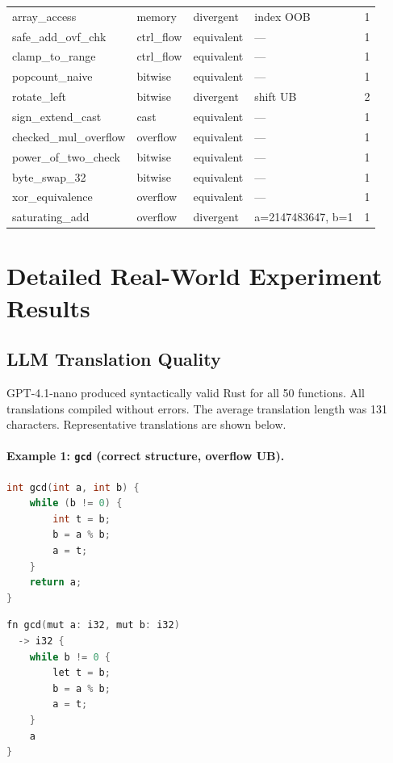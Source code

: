 \documentclass[11pt,a4paper]{article}
\begin{document}
\begin{appendices}
\begin{table}[h]
\begin{tabular}{@{}llllr@{}}
array\_access            & memory     & divergent & index OOB & 1 \\
safe_add_ovf_chk & ctrl\_flow & equivalent & --- & 1 \\
clamp\_to\_range         & ctrl\_flow & equivalent & --- & 1 \\
popcount\_naive          & bitwise    & equivalent & --- & 1 \\
rotate_left& bitwise   & divergent  & shift UB & 2 \\
sign\_extend\_cast       & cast       & equivalent & --- & 1 \\
checked\_mul\_overflow   & overflow   & equivalent & --- & 1 \\
power\_of\_two\_check    & bitwise    & equivalent & --- & 1 \\
byte\_swap\_32           & bitwise    & equivalent & --- & 1 \\
xor\_equivalence         & overflow   & equivalent & --- & 1 \\
saturating\_add          & overflow   & divergent  & a=2147483647, b=1 & 1 \\
\bottomrule
\end{tabular}
\end{table}


\section{Detailed Real-World Experiment Results}\label{app:realworld-detailed}

\subsection{LLM Translation Quality}

GPT-4.1-nano produced syntactically valid Rust for all 50 functions.
All translations compiled without errors.  The average translation
length was 131 characters.  Representative translations are shown below.

\paragraph{Example 1: \texttt{gcd} (correct structure, overflow UB).}
\begin{minipage}[t]{0.48\textwidth}
\begin{lstlisting}[language=C,title=C source]
int gcd(int a, int b) {
    while (b != 0) {
        int t = b;
        b = a % b;
        a = t;
    }
    return a;
}
\end{lstlisting}
\end{minipage}
\hfill
\begin{minipage}[t]{0.48\textwidth}
\begin{lstlisting}[language=C,title=LLM Rust translation]
fn gcd(mut a: i32, mut b: i32)
  -> i32 {
    while b != 0 {
        let t = b;
        b = a % b;
        a = t;
    }
    a
}
\end{lstlisting}
\end{minipage}


\end{appendices}
\end{document}
